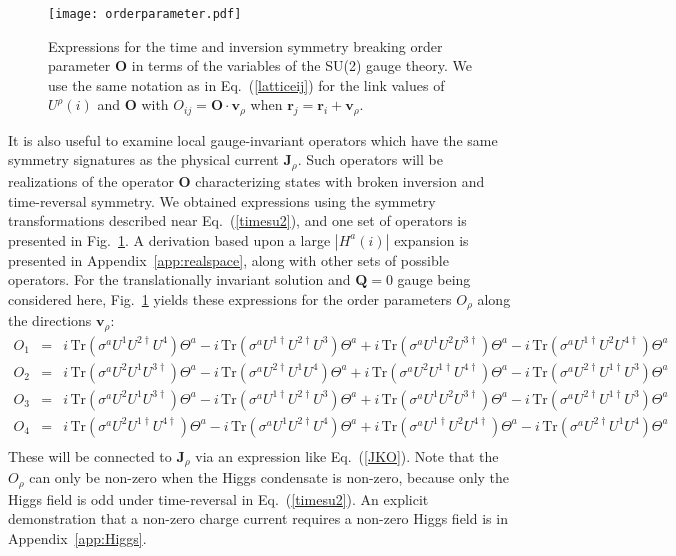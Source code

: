\documentclass[aps,prb,preprint,onecolumn,citeautoscript,superscriptaddress,footinbib,
eqsecnum]{revtex4-1}
\def\bea{\begin{eqnarray}}
\def\eea{\end{eqnarray}}
\newcommand{\nn}{\nonumber \\}
\begin{document}
\begin{figure}
\begin{center}
\texttt{[image: orderparameter.pdf]}
\end{center}
\caption{Expressions for the time and inversion symmetry breaking order parameter ${\bm O}$
in terms of the variables of the SU(2) gauge theory. We use the same notation as in Eq.~(\ref{latticeij}) for the link values of $U^\rho (i)$ and ${\bm O}$ with $O_{ij} = {\bm O} \cdot {\bm v}_{\rho}$
when ${\bm r}_j = {\bm r}_i + {\bm v}_\rho$.}
\label{fig:O}
\end{figure}
It is also useful to examine local gauge-invariant operators
which have the same symmetry signatures as the physical current
${\bm J}_\rho$. Such operators will be realizations of the 
operator ${\bm O}$ characterizing states with broken
inversion and time-reversal symmetry. We obtained expressions using the symmetry
transformations described near Eq.~(\ref{timesu2}), 
and one set of operators is presented in Fig.~\ref{fig:O}. A derivation based upon a large $|H^a(i)|$
expansion is presented in Appendix~\ref{app:realspace}, along with other sets of possible operators.
For the translationally invariant solution and ${\bm Q}=0$ gauge being considered here, Fig.~\ref{fig:O} yields these expressions
for the order parameters $O_\rho$ along the directions ${\bm v}_\rho$:
\bea 
O_1 &=& i \, \mbox{Tr} \left(\sigma^a U^1 U^{2 \dagger} U^4 \right) \Theta^a - i \, \mbox{Tr} \left(\sigma^a U^{1 \dagger} U^{2 \dagger} U^{3} \right) \Theta^a +
 i \, \mbox{Tr} \left(\sigma^a U^{1} U^{2} U^{3 \dagger} \right) \Theta^a
- i \, \mbox{Tr} \left(\sigma^a U^{1 \dagger} U^{2} U^{4 \dagger} \right) \Theta^a  \nn
O_2 &=& i \, \mbox{Tr} \left(\sigma^a U^2 U^1 U^{3 \dagger} \right) \Theta^a 
- i \, \mbox{Tr} \left(\sigma^a U^{2 \dagger} U^1 U^{4} \right) \Theta^a + 
i \, \mbox{Tr} \left(\sigma^a U^2 U^{1\dagger} U^{4 \dagger} \right) \Theta^a
- i \, \mbox{Tr} \left(\sigma^a U^{2 \dagger} U^{1 \dagger} U^{3} \right) \Theta^a \nn
O_3 &=& i \, \mbox{Tr} \left(\sigma^a U^2 U^1 U^{3 \dagger} \right) \Theta^a 
- i \, \mbox{Tr} \left(\sigma^a U^{1 \dagger} U^{2 \dagger} U^{3} \right) \Theta^a + 
i \, \mbox{Tr} \left(\sigma^a U^1 U^{2} U^{3 \dagger} \right) \Theta^a
- i \, \mbox{Tr} \left(\sigma^a U^{2 \dagger} U^{1 \dagger} U^{3} \right) \Theta^a \nn 
O_4 &=& i \, \mbox{Tr} \left(\sigma^a U^2 U^{1 \dagger} U^{4 \dagger} \right) \Theta^a 
- i \, \mbox{Tr} \left(\sigma^a U^{1} U^{2 \dagger} U^{4} \right) \Theta^a + 
i \, \mbox{Tr} \left(\sigma^a U^{1 \dagger} U^{2} U^{4 \dagger} \right) \Theta^a
- i \, \mbox{Tr} \left(\sigma^a U^{2 \dagger} U^{1} U^{4} \right) \Theta^a \nn 
\eea 
These will be connected to ${\bm J}_\rho$ via an expression like Eq.~(\ref{JKO}). Note 
that the $O_\rho$ can only be non-zero
when the Higgs condensate is non-zero, because only the Higgs field
is odd under time-reversal in Eq.~(\ref{timesu2}). An explicit demonstration that a non-zero
charge current requires a non-zero Higgs field is in Appendix~\ref{app:Higgs}.
\end{document}
